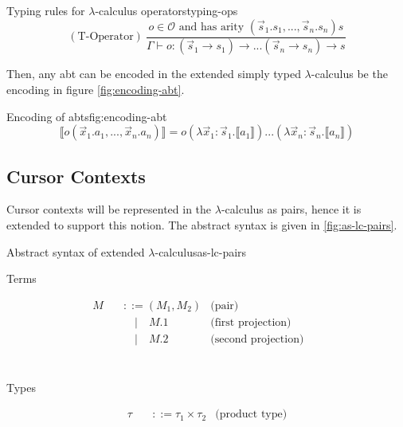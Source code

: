 \begin{myfigure}{Typing rules for $\lambda$-calculus operators}{typing-ops}
    \[
        (\text{T-Operator}) \ \frac{o \in \mathcal{O} \text{ and has arity } (\Vec{s}_1.s_1,...,\Vec{s}_n.s_n)s}{\Gamma \vdash o : (\Vec{s}_1 \rightarrow s_1) \rightarrow ... (\Vec{s}_n \rightarrow s_n) \rightarrow s}
    \]
\end{myfigure}

Then, any abt can be encoded in the extended simply typed $\lambda$-calculus be the encoding in figure \ref{fig:encoding-abt}.

\begin{myfigure}{Encoding of abts}{fig:encoding-abt}
    \[
        \llbracket o(\Vec{x}_1.a_1,...,\Vec{x}_n.a_n) \rrbracket = o(\lambda \Vec{x}_1:\Vec{s}_1.\llbracket a_1 \rrbracket)...(\lambda \Vec{x}_n : \Vec{s}_n.\llbracket a_n \rrbracket)
    \]
\end{myfigure}

\subsection{Cursor Contexts}
Cursor contexts will be represented in the $\lambda$-calculus as pairs, hence it is extended to support this notion. The abstract syntax is given in \ref{fig:as-lc-pairs}.

\begin{myfigure}{Abstract syntax of extended $\lambda$-calculus}{as-lc-pairs}
    \begin{center}
        Terms
    \end{center}
    \[
        \begin{aligned}
            M \quad & ::= (M_1,M_2)     & \text{(pair)}              &  & \\
                    & \quad | \quad M.1 & \text{(first projection)}  &  & \\
                    & \quad | \quad M.2 & \text{(second projection)} &  & \\
        \end{aligned}
    \]
    \\
    \begin{center}
        Types
    \end{center}
    \[
        \begin{aligned}
            \tau \quad & ::= \tau_1 \times \tau_2 & \text{(product type)}
        \end{aligned}
    \]
\end{myfigure}

